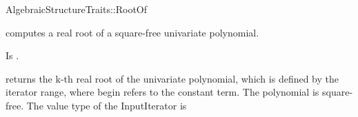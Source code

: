 \begin{ccRefConcept}{AlgebraicStructureTraits::RootOf}

\ccDefinition

 computes a real root of a square-free univariate
polynomial.

\ccRefines


\ccTypes
{} 
        { Is .}

\ccOperations
{}

        {returns the k-th real root of the univariate polynomial,
        which is defined by the iterator range,
        where begin refers to the constant term.
        \ccPrecond The polynomial is square-free.
        \ccPrecond The value type of the InputIterator is \\ }



\ccSeeAlso

\\

\end{ccRefConcept}
